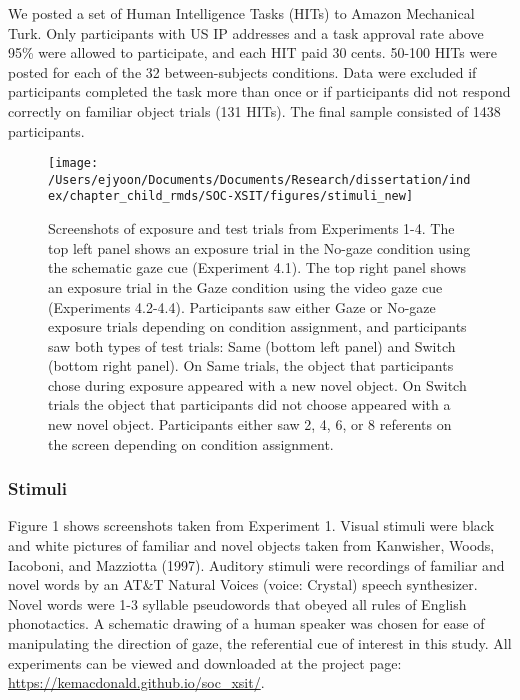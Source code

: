 \documentclass[oneside]{report}
\begin{document}
We posted a set of Human Intelligence Tasks (HITs) to Amazon Mechanical
Turk. Only participants with US IP addresses and a task approval rate
above 95\% were allowed to participate, and each HIT paid 30 cents.
50-100 HITs were posted for each of the 32 between-subjects conditions.
Data were excluded if participants completed the task more than once or
if participants did not respond correctly on familiar object trials (131
HITs). The final sample consisted of 1438 participants.
\begin{figure}[!t]

{\centering \texttt{[image: /Users/ejyoon/Documents/Documents/Research/dissertation/index/chapter\_child\_rmds/SOC-XSIT/figures/stimuli\_new]} 

}

\caption[Examples of stimuli for exposure and test trials from Experiments 4.1-4.4.]{Screenshots of exposure and test trials from Experiments 1-4. The top left panel shows an exposure trial in the No-gaze condition using the schematic gaze cue (Experiment 4.1). The top right panel shows an exposure trial in the Gaze condition using the video gaze cue (Experiments 4.2-4.4). Participants saw either Gaze or No-gaze exposure trials depending on condition assignment, and participants saw both types of test trials: Same (bottom left panel) and Switch (bottom right panel). On Same trials, the object that participants chose during exposure appeared with a new novel object. On Switch trials the object that participants did not choose appeared with a new novel object. Participants either saw 2, 4, 6, or 8 referents on the screen depending on condition assignment.}\label{fig:stimuli}
\end{figure}
\subsubsection{Stimuli}\label{stimuli-1}

Figure 1 shows screenshots taken from Experiment 1. Visual stimuli were
black and white pictures of familiar and novel objects taken from
Kanwisher, Woods, Iacoboni, and Mazziotta (1997). Auditory stimuli were
recordings of familiar and novel words by an AT\&T Natural Voices
\texttrademark (voice: Crystal) speech synthesizer. Novel words were 1-3
syllable pseudowords that obeyed all rules of English phonotactics. A
schematic drawing of a human speaker was chosen for ease of manipulating
the direction of gaze, the referential cue of interest in this study.
All experiments can be viewed and downloaded at the project page:
\url{https://kemacdonald.github.io/soc_xsit/}.
\end{document}
